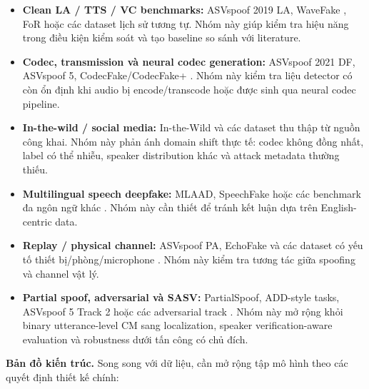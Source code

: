 \begin{itemize}
    \item \textbf{Clean LA / TTS / VC benchmarks:} ASVspoof 2019 LA, WaveFake \cite{wavefake}, FoR \cite{for_dataset} hoặc các dataset lịch sử tương tự. Nhóm này giúp kiểm tra hiệu năng trong điều kiện kiểm soát và tạo baseline so sánh với literature.
    \item \textbf{Codec, transmission và neural codec generation:} ASVspoof 2021 DF, ASVspoof 5, CodecFake/CodecFake+ \cite{codecfake,codecfakeplus}. Nhóm này kiểm tra liệu detector có còn ổn định khi audio bị encode/transcode hoặc được sinh qua neural codec pipeline.
    \item \textbf{In-the-wild / social media:} In-the-Wild và các dataset thu thập từ nguồn công khai. Nhóm này phản ánh domain shift thực tế: codec không đồng nhất, label có thể nhiễu, speaker distribution khác và attack metadata thường thiếu.
    \item \textbf{Multilingual speech deepfake:} MLAAD, SpeechFake hoặc các benchmark đa ngôn ngữ khác \cite{mlaad,speechfake}. Nhóm này cần thiết để tránh kết luận dựa trên English-centric data.
    \item \textbf{Replay / physical channel:} ASVspoof PA, EchoFake và các dataset có yếu tố thiết bị/phòng/microphone \cite{echofake}. Nhóm này kiểm tra tương tác giữa spoofing và channel vật lý.
    \item \textbf{Partial spoof, adversarial và SASV:} PartialSpoof, ADD-style tasks, ASVspoof 5 Track 2 hoặc các adversarial track \cite{partialspoof,add2022,add2023,asvspoof5_eval}. Nhóm này mở rộng khỏi binary utterance-level CM sang localization, speaker verification-aware evaluation và robustness dưới tấn công có chủ đích.
\end{itemize}

\textbf{Bản đồ kiến trúc.} Song song với dữ liệu, cần mở rộng tập mô hình theo các quyết định thiết kế chính:

